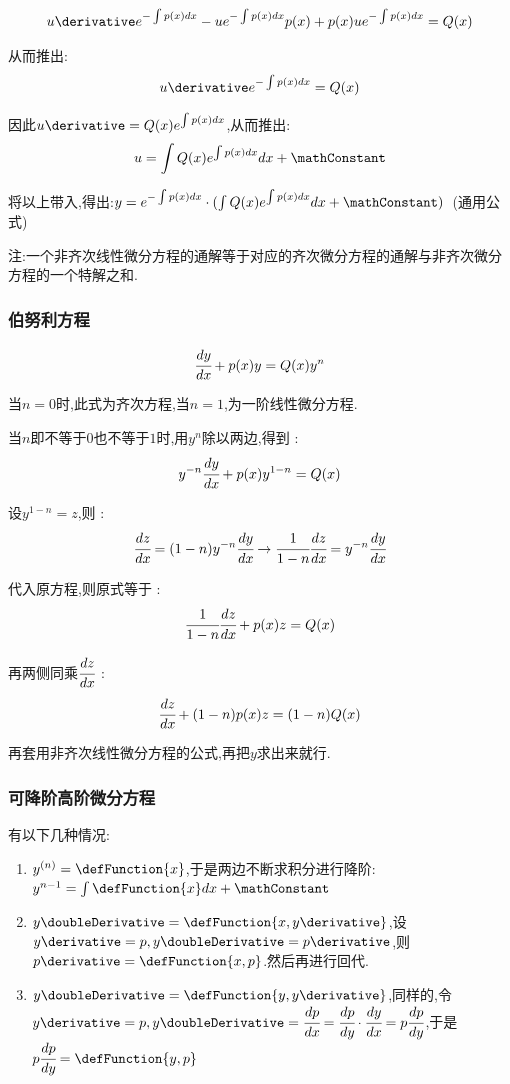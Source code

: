 {{{\begin{enumerate}
{          $$
            u\derivative e^{-\int p(x)dx} - ue^{-\int p(x)dx}p(x) + p(x)ue^{-\int p(x)dx} = Q(x)
          $$

          从而推出:
          $$
            u\derivative e^{-\int p(x)dx} = Q(x)
          $$

          因此$u\derivative = Q(x)e^{\int p(x)dx}$,从而推出:
          $$
            u = \int Q(x)e^{\int p(x)dx}dx + \mathConstant
          $$

          将以上带入,得出:$y = e^{-\int p(x)dx}\cdot(\int Q(x)e^{\int p(x)dx}dx + \mathConstant)$\ (通用公式)
          }
  \end{enumerate}

  注:一个非齐次线性微分方程的通解等于对应的齐次微分方程的通解与非齐次微分方程的一个特解之和.

}%

\subsubsection{伯努利方程}{
  $$
    \cfrac{dy}{dx} + p(x)y = Q(x)y^n
  $$

  当$n = 0$时,此式为齐次方程,当$n = 1$,为一阶线性微分方程.

  当$n$即不等于$0$也不等于$1$时,用$y^n$除以两边,得到 :
  $$
    y^{-n}\cfrac{dy}{dx} + p(x)y^{1 - n} = Q(x)
  $$

  设$y^{1 - n} = z$,则 :
  $$
    \cfrac{dz}{dx} = (1 - n)y^{-n}\cfrac{dy}{dx} \to \cfrac{1}{1 - n}\cfrac{dz}{dx} = y^{-n}\cfrac{dy}{dx}
  $$

  代入原方程,则原式等于 :
  $$
    \cfrac{1}{1 - n}\cfrac{dz}{dx} + p(x)z = Q(x)
  $$

  再两侧同乘$\cfrac{dz}{dx}$ :
  $$
    \cfrac{dz}{dx} + (1 - n)p(x)z = (1 - n)Q(x)
  $$

  再套用非齐次线性微分方程的公式,再把$y$求出来就行.
}%

\subsubsection{可降阶高阶微分方程}{
  有以下几种情况:

  \begin{enumerate}
    \item $y^{(n)} = \defFunction{x}$,于是两边不断求积分进行降阶:$y^{n-1} = \int \defFunction{x}dx + \mathConstant$
    \item $y\doubleDerivative = \defFunction{x,y\derivative}$,设$y\derivative = p,y\doubleDerivative = p\derivative$,则$p\derivative = \defFunction{x,p}$.然后再进行回代.
    \item $y\doubleDerivative = \defFunction{y,y\derivative}$,同样的,令$y\derivative = p, y\doubleDerivative = \cfrac{dp}{dx} = \cfrac{dp}{dy}\cdot\cfrac{dy}{dx} = p\cfrac{dp}{dy}$,于是$p\cfrac{dp}{dy} = \defFunction{y,p}$
  \end{enumerate}

}}}
